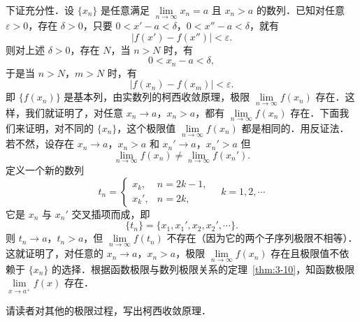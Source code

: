 下证充分性．设 $\{x_n\}$ 是任意满足 $\lim\limits_{n \to \infty} x_n = a$ 且 $x_n > a$ 的数列．已知对任意 $\varepsilon > 0$，存在 $\delta > 0$，只要 $0 < x' - a < \delta$，$0 < x'' - a < \delta$，就有
\[
|f(x') - f(x'')| < \varepsilon.
\]
则对上述 $\delta > 0$，存在 $N$，当 $n > N$ 时，有
\[
0 < x_n - a < \delta,
\]
于是当 $n > N$，$m > N$ 时，有
\[
|f(x_n) - f(x_m)| < \varepsilon.
\]
即 $\{f(x_n)\}$ 是基本列，由实数列的柯西收敛原理，极限 $\lim\limits_{n \to \infty} f(x_n)$ 存在．这样，我们就证明了，对任意 $x_n \to a$，$x_n > a$，都有 $\lim\limits_{n \to \infty} f(x_n)$ 存在．下面我们来证明，对不同的 $\{x_n\}$，这个极限值 $\lim\limits_{n \to \infty} f(x_n)$ 都是相同的．用反证法．若不然，设存在 $x_n \to a$，$x_n > a$ 和 $x_n' \to a$，$x_n' > a$ 但
\[
\lim_{n \to \infty} f(x_n) \neq \lim_{n \to \infty} f(x_n').
\]
定义一个新的数列
\[
t_n =
\begin{cases}
x_k, & n = 2k - 1, \\
x_k', & n = 2k,
\end{cases}
\quad k = 1, 2, \cdots
\]
它是 $x_n$ 与 $x_n'$ 交叉插项而成，即
\[
\{t_n\} = \{x_1, x_1', x_2, x_2', \cdots\}.
\]
则 $t_n \to a$，$t_n > a$，但 $\lim\limits_{n \to \infty} f(t_n)$ 不存在（因为它的两个子序列极限不相等）．这就证明了，对任意的 $x_n \to a$，$x_n > a$，极限 $\lim\limits_{n \to \infty} f(x_n)$ 存在且极限值不依赖于 $\{x_n\}$ 的选择．根据函数极限与数列极限关系的定理~\ref{thm:3-10}，知函数极限 $\lim\limits_{x \to a^+} f(x)$ 存在．

请读者对其他的极限过程，写出柯西收敛原理．

